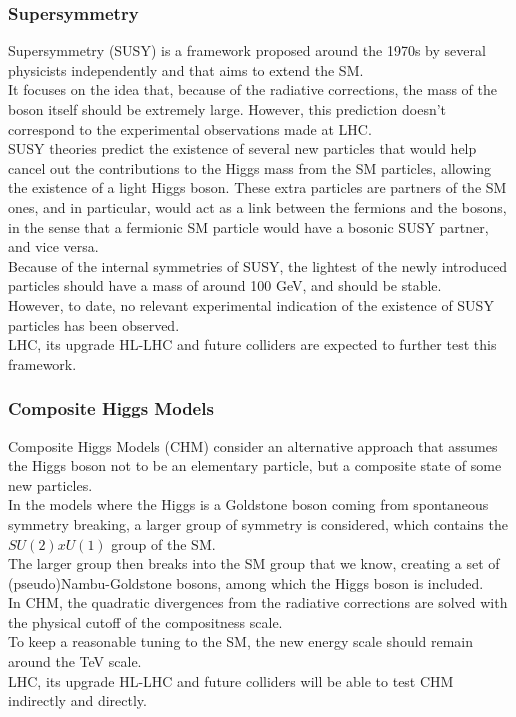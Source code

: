 \subsubsection{Supersymmetry}
Supersymmetry (SUSY) \cite{susy} is a framework proposed around the 1970s by several physicists independently and that aims to extend the SM.\\
It focuses on the idea that, because of the radiative corrections, the mass of the boson itself should be extremely large. However, this prediction doesn't correspond to the experimental observations made at LHC. \\
SUSY theories predict the existence of several new particles that would help cancel out the contributions to the Higgs mass from the SM particles, allowing the existence of a light Higgs boson. These extra particles are partners of the SM ones, and in particular, would act as a link between the fermions and the bosons, in the sense that a fermionic SM particle would have a bosonic SUSY partner, and vice versa.\\
Because of the internal symmetries of SUSY, the lightest of the newly introduced particles should have a mass of around 100 GeV, and should be stable.\\
However, to date, no relevant experimental indication of the existence of SUSY particles has been observed. \\
LHC, its upgrade HL-LHC and future colliders are expected to further test this framework.\\
\subsubsection{Composite Higgs Models}
Composite Higgs Models (CHM) \cite{chm} consider an alternative approach that assumes the Higgs boson not to be an elementary particle, but a composite state of some new particles. \\
In the models where the Higgs is a Goldstone boson coming from spontaneous symmetry breaking, a larger group of symmetry is considered, which contains the $SU(2)x U(1)$ group of the SM.\\
The larger group then breaks into the SM group that we know, creating a set of (pseudo)Nambu-Goldstone bosons, among which the Higgs boson is included.\\
In CHM, the quadratic divergences from the radiative corrections are solved with the physical cutoff of the compositness scale.\\
To keep a reasonable tuning to the SM, the new energy scale should remain around the TeV scale.\\
LHC, its upgrade HL-LHC and future colliders will be able to test CHM indirectly and directly.

